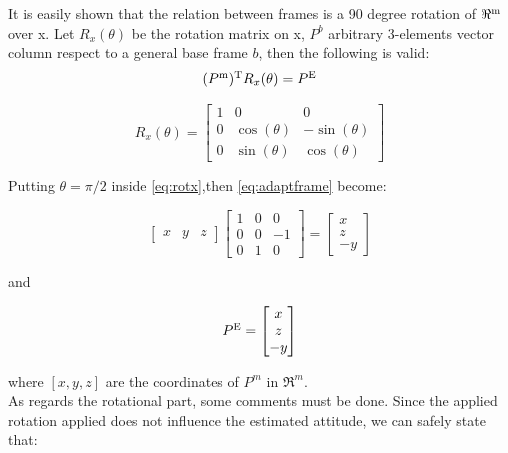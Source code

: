 It is easily shown that the relation between frames is a 90 degree rotation of $\Re\textsuperscript{m}$ over x. Let $R_x(\theta)$ be the rotation matrix on x, $P^b$ arbitrary  3-elements vector column respect to a general base frame $b$, then the following is valid:
\begin{equation}
(P\textsuperscript{m})\textsuperscript{T}R_x(\theta) = P\textsuperscript{E}
\label{eq:adaptframe}
\end{equation}

\begin{equation}
R_x(\theta) = \begin{bmatrix} 1 & 0            & 0 \\
							  0 & \cos(\theta) & -\sin(\theta)\\
                              0 & \sin(\theta) &  \cos(\theta) 
\end{bmatrix}
\label{eq:rotx}
\end{equation}

Putting $\theta = \pi/2$ inside \ref{eq:rotx},then \ref{eq:adaptframe} become:

\begin{equation}
\begin{bmatrix}x&y&z\end{bmatrix}\begin{bmatrix} 1 & 0 & 0 \\
							  					 0 & 0 & -1\\
                              					 0 & 1 & 0
\end{bmatrix} = \begin{bmatrix}x\\z\\-y\end{bmatrix}
\label{eq:rotexplained}
\end{equation}

and

\begin{equation}
P\textsuperscript{E} = \begin{bmatrix}x\\z\\-y\end{bmatrix}
\label{eq:translation}
\end{equation}

where $[x, y, z]$ are the coordinates of $P^m$ in $\Re^m$.\\

\noindent
As regards the rotational part, some comments must be done. Since the applied rotation applied does not influence the estimated attitude, we can safely state that:


